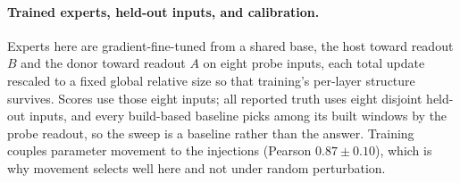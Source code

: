 \documentclass{article}
\theoremstyle{plain}
\theoremstyle{definition}
\theoremstyle{remark}
\begin{document}
\paragraph{Trained experts, held-out inputs, and calibration.}
Experts here are gradient-fine-tuned from a shared base, the host toward readout
$B$ and the donor toward readout $A$ on eight probe inputs, each total update
rescaled to a fixed global relative size so that training's per-layer structure
survives. Scores use those eight inputs; all reported truth uses eight disjoint
held-out inputs, and every build-based baseline picks among its built windows by
the probe readout, so the sweep is a baseline rather than the answer. Training
couples parameter movement to the injections (Pearson
$0.87\pm0.10$), which is why movement selects well here and not under random
perturbation.
\end{document}
